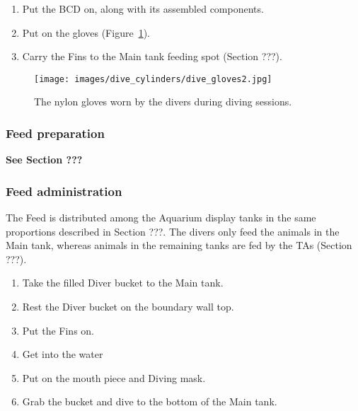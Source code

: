 \documentclass[
  letterpaper,
  DIV=11,
  numbers=noendperiod]{scrreprt}
\providecommand{\tightlist}{%
  \setlength{\itemsep}{0pt}\setlength{\parskip}{0pt}}\usepackage{longtable,booktabs,array}
\begin{document}
\begin{enumerate}
\def\labelenumi{\arabic{enumi}.}
\setcounter{enumi}{9}
\tightlist
\item
  Put the BCD on, along with its assembled components.
\item
  Put on the gloves (Figure~\ref{fig-dive-gloves}).
\item
  Carry the Fins to the Main tank feeding spot (Section ???).
\end{enumerate}

\begin{figure}[H]

{\centering \texttt{[image: images/dive\_cylinders/dive\_gloves2.jpg]}

}

\caption{\label{fig-dive-gloves}The nylon gloves worn by the divers
during diving sessions.}

\end{figure}

\hypertarget{feed-preparation-1}{%
\subsubsection{Feed preparation}\label{feed-preparation-1}}

\textbf{See Section ???}

\hypertarget{feed-administration-1}{%
\subsubsection{Feed administration}\label{feed-administration-1}}

The Feed is distributed among the Aquarium display tanks in the same
proportions described in Section ???. The divers only feed the animals
in the Main tank, whereas animals in the remaining tanks are fed by the
TAs (Section ???).

\begin{enumerate}
\def\labelenumi{\arabic{enumi}.}
\setcounter{enumi}{22}
\tightlist
\item
  Take the filled Diver bucket to the Main tank.
\item
  Rest the Diver bucket on the boundary wall top.
\item
  Put the Fins on.
\item
  Get into the water
\item
  Put on the mouth piece and Diving mask.
\item
  Grab the bucket and dive to the bottom of the Main tank.
\end{enumerate}
\end{document}
